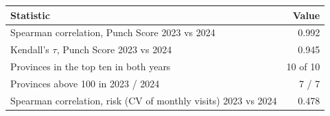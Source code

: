 \begin{tabular}{lr}
\toprule
Statistic & Value \\
\midrule
Spearman correlation, Punch Score 2023 vs 2024 & 0.992 \\
Kendall's $\tau$, Punch Score 2023 vs 2024 & 0.945 \\
Provinces in the top ten in both years & 10 of 10 \\
Provinces above 100 in 2023 / 2024 & 7 / 7 \\
Spearman correlation, risk (CV of monthly visits) 2023 vs 2024 & 0.478 \\
\bottomrule
\end{tabular}
